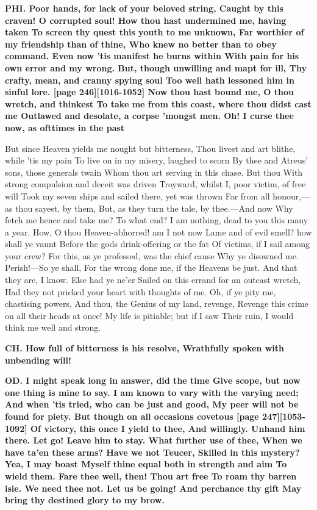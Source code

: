 \documentclass[11pt,letter]{book}
\begin{document}
\par \textbf{PHI. Poor hands, for lack of your beloved string, Caught by this craven! O corrupted soul! How thou hast undermined me, having taken To screen thy quest this youth to me unknown, Far worthier of my friendship than of thine, Who knew no better than to obey command. Even now ’tis manifest he burns within With pain for his own error and my wrong. But, though unwilling and mapt for ill, Thy crafty, mean, and cranny spying soul Too well hath lessoned him in sinful lore. [page 246][1016-1052] Now thou hast bound me, O thou wretch, and thinkest To take me from this coast, where thou didst cast me Outlawed and desolate, a corpse ’mongst men. Oh! I curse thee now, as ofttimes in the past}
\par   But since Heaven yields me nought but bitterness, Thou livest and art blithe, while ’tis my pain To live on in my misery, laughed to scorn By thee and Atreus’ sons, those generals twain Whom thou art serving in this chase. But thou With strong compulsion and deceit was driven Troyward, whilst I, poor victim, of free will Took my seven ships and sailed there, yet was thrown Far from all honour,—as thou sayest, by them, But, as they turn the tale, by thee.—And now Why fetch me hence and take me? To what end? I am nothing, dead to you this many a year. How, O thou Heaven-abhorred! am I not now Lame and of evil smell? how shall ye vaunt Before the gods drink-offering or the fat Of victims, if I sail among your crew? For this, as ye professed, was the chief cause Why ye disowned me. Perish!—So ye shall, For the wrong done me, if the Heavens be just. And that they are, I know. Else had ye ne’er Sailed on this errand for an outcast wretch, Had they not pricked your heart with thoughts of me. Oh, if ye pity me, chastising powers, And thou, the Genius of my land, revenge, Revenge this crime on all their heads at once! My life is pitiable; but if I saw Their ruin, I would think me well and strong.

\par \textbf{CH. How full of bitterness is his resolve, Wrathfully spoken with unbending will!}
\par 

\par \textbf{OD. I might speak long in answer, did the time Give scope, but now one thing is mine to say. I am known to vary with the varying need; And when ’tis tried, who can be just and good, My peer will not be found for piety. But though on all occasions covetous [page 247][1053-1092] Of victory, this once I yield to thee, And willingly. Unhand him there. Let go! Leave him to stay. What further use of thee, When we have ta’en these arms? Have we not Teucer, Skilled in this mystery? Yea, I may boast Myself thine equal both in strength and aim To wield them. Fare thee well, then! Thou art free To roam thy barren isle. We need thee not. Let us be going! And perchance thy gift May bring thy destined glory to my brow.}
\par 
\end{document}

